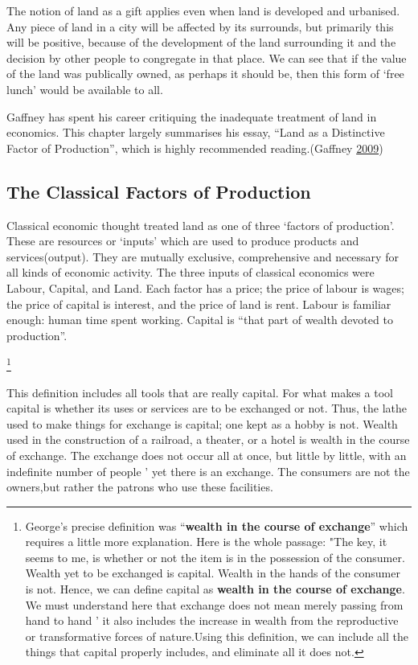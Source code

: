 \documentclass[]{tufte-handout}
\begin{document}
The notion of land as a gift applies even when land is developed and
urbanised. Any piece of land in a city will be affected by its
surrounds, but primarily this will be positive, because of the
development of the land surrounding it and the decision by other people
to congregate in that place. We can see that if the value of the land
was publically owned, as perhaps it should be, then this form of `free
lunch' would be available to all.

Gaffney has spent his career critiquing the inadequate treatment of land
in economics. This chapter largely summarises his essay, ``Land as a
Distinctive Factor of Production'', which is highly recommended
reading.(Gaffney \protect\hyperlink{ref-Gaffney2009}{2009})

\hypertarget{the-classical-factors-of-production}{%
\subsection{The Classical Factors of
Production}\label{the-classical-factors-of-production}}

Classical economic thought treated land as one of three `factors of
production'. These are resources or `inputs' which are used to produce
products and services(output). They are mutually exclusive,
comprehensive and necessary for all kinds of economic activity. The
three inputs of classical economics were Labour, Capital, and Land. Each
factor has a price; the price of labour is wages; the price of capital
is interest, and the price of land is rent. Labour is familiar enough:
human time spent working. Capital is ``that part of wealth devoted to
production''.

\footnote{George's precise definition was ``\textbf{wealth in the course
  of exchange}'' which requires a little more explanation. Here is the
  whole passage: "The key, it seems to me, is whether or not the item is
  in the possession of the consumer. Wealth yet to be exchanged is
  capital. Wealth in the hands of the consumer is not. Hence, we can
  define capital as \textbf{wealth in the course of exchange}. We must
  understand here that exchange does not mean merely passing from hand
  to hand ' it also includes the increase in wealth from the
  reproductive or transformative forces of nature.Using this definition,
  we can include all the things that capital properly includes, and
  eliminate all it does not.}

This definition includes all tools that are really capital. For what
makes a tool capital is whether its uses or services are to be exchanged
or not. Thus, the lathe used to make things for exchange is capital; one
kept as a hobby is not. Wealth used in the construction of a railroad, a
theater, or a hotel is wealth in the course of exchange. The exchange
does not occur all at once, but little by little, with an indefinite
number of people ' yet there is an exchange. The consumers are not the
owners,but rather the patrons who use these facilities.
\end{document}
